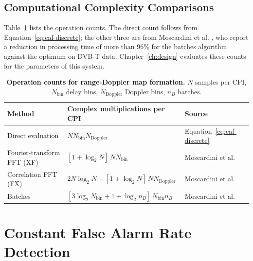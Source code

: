 \subsection{Computational Complexity Comparisons}
\label{subsec:th.ard.complexity}
\todo{}
Table~\ref{table:ch2.caf-complexity} lists the operation counts. The direct count follows from Equation~\ref{eq:caf-discrete}; the other three are from Moscardini et al. \citep{moscardini2015}, who report a reduction in processing time of more than 96\% for the batches algorithm against the optimum on DVB-T data. Chapter~\ref{ch:design} evaluates these counts for the parameters of this system.

\begin{table}[H]
    \centering
    \caption[Operation counts for range-Doppler map formation]{\textbf{Operation counts for range-Doppler map formation.} $N$ samples per CPI, $N_{\mathrm{bin}}$ delay bins, $N_{\mathrm{Doppler}}$ Doppler bins, $n_B$ batches.}
    \begin{tabular}{lll}
    \toprule
    \textbf{Method} & \textbf{Complex multiplications per CPI} & \textbf{Source} \\
    \midrule
    Direct evaluation           & $N N_{\mathrm{bin}} N_{\mathrm{Doppler}}$                                        & Equation~\ref{eq:caf-discrete} \\
    Fourier-transform FFT (XF)  & $[1 + \log_2 N]\, N N_{\mathrm{bin}}$                                            & Moscardini et al. \citep{moscardini2015} \\
    Correlation FFT (FX)        & $2 N \log_2 N + [1 + \log_2 N]\, N N_{\mathrm{Doppler}}$                         & Moscardini et al. \citep{moscardini2015} \\
    Batches                     & $[3 \log_2 N_{\mathrm{bin}} + 1 + \log_2 n_B]\, N_{\mathrm{bin}} n_B$             & Moscardini et al. \citep{moscardini2015} \\
    \bottomrule
    \end{tabular}
    \label{table:ch2.caf-complexity}
\end{table}

\section{Constant False Alarm Rate Detection}
\label{sec:th.cfar}
\todo{}

